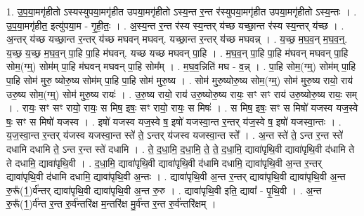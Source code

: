 \documentclass[17pt]{extarticle}
\begin{document}
1. उ॒प॒या॒मगृ॑हीतो ऽस्यस्युपया॒मगृ॑हीत उपया॒मगृ॑हीतो ऽस्य॒न्त र॒न्त र॑स्युपया॒मगृ॑हीत उपया॒मगृ॑हीतो ऽस्य॒न्तः । . उ॒प॒या॒मगृ॑हीत॒ इत्यु॑पया॒म - गृ॒ही॒तः॒ । . अ॒स्य॒न्त र॒न्त र॑स्य स्य॒न्तर् य॑च्छ यच्छा॒न्त र॑स्य स्य॒न्तर् य॑च्छ । . अ॒न्तर् य॑च्छ यच्छा॒न्त र॒न्तर् य॑च्छ मघवन् मघवन्. यच्छा॒न्त र॒न्तर् य॑च्छ मघवन्न् । . य॒च्छ॒ म॒घ॒व॒न् म॒घ॒व॒न्॒. य॒च्छ॒ य॒च्छ॒ म॒घ॒व॒न् पा॒हि पा॒हि म॑घवन्. यच्छ यच्छ मघवन् पा॒हि । . म॒घ॒व॒न् पा॒हि पा॒हि म॑घवन् मघवन् पा॒हि सोम॒(ग्म्॒) सोम॑म् पा॒हि म॑घवन् मघवन् पा॒हि सोम᳚म् । . म॒घ॒व॒न्निति॑ मघ - व॒न्न् । . पा॒हि सोम॒(ग्म्॒) सोम॑म् पा॒हि पा॒हि सोम॑ मुरु॒ ष्योरु॒ष्य सोम॑म् पा॒हि पा॒हि सोम॑ मुरु॒ष्य । . सोम॑ मुरु॒ष्योरु॒ष्य सोम॒(ग्म्॒) सोम॑ मुरु॒ष्य रायो॒ राय॑ उरु॒ष्य सोम॒(ग्म्॒) सोम॑ मुरु॒ष्य रायः॑ । . उ॒रु॒ष्य रायो॒ राय॑ उरु॒ष्योरु॒ष्य रायः॒ सꣳ सꣳ राय॑ उरु॒ष्योरु॒ष्य रायः॒ सम् । . रायः॒ सꣳ सꣳ रायो॒ रायः॒ स मिष॒ इषः॒ सꣳ रायो॒ रायः॒ स मिषः॑ । . स मिष॒ इषः॒ सꣳ स मिषो॑ यजस्व यज॒स्वे षः॒ सꣳ स मिषो॑ यजस्व । . इषो॑ यजस्व यज॒स्वे ष॒ इषो॑ यजस्वा॒न्त र॒न्तर् य॑ज॒स्वे ष॒ इषो॑ यजस्वा॒न्तः । . य॒ज॒स्वा॒न्त र॒न्तर् य॑जस्व यजस्वा॒न्त स्ते॑ ते॒ ऽन्तर् य॑जस्व यजस्वा॒न्त स्ते᳚ । . अ॒न्त स्ते॑ ते॒ ऽन्त र॒न्त स्ते॑ दधामि दधामि ते॒ ऽन्त र॒न्त स्ते॑ दधामि । . ते॒ द॒धा॒मि॒ द॒धा॒मि॒ ते॒ ते॒ द॒धा॒मि॒ द्यावा॑पृथि॒वी द्यावा॑पृथि॒वी द॑धामि ते ते दधामि॒ द्यावा॑पृथि॒वी । . द॒धा॒मि॒ द्यावा॑पृथि॒वी द्यावा॑पृथि॒वी द॑धामि दधामि॒ द्यावा॑पृथि॒वी अ॒न्त र॒न्तर् द्यावा॑पृथि॒वी द॑धामि दधामि॒ द्यावा॑पृथि॒वी अ॒न्तः । . द्यावा॑पृथि॒वी अ॒न्त र॒न्तर् द्यावा॑पृथि॒वी द्यावा॑पृथि॒वी अ॒न्त रु॒रू᳚(1॒)र्व॑न्तर् द्यावा॑पृथि॒वी द्यावा॑पृथि॒वी अ॒न्त रु॒रु । . द्यावा॑पृथि॒वी इति॒ द्यावा᳚ - पृ॒थि॒वी । . अ॒न्त रु॒रू᳚(1॒)र्व॑न्त र॒न्त रु॒र्व॑न्तरि॑क्ष म॒न्तरि॑क्ष मु॒र्व॑न्त र॒न्त रु॒र्व॑न्तरि॑क्षम् । \newline
\end{document}
